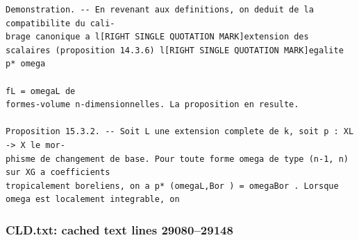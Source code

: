 \documentclass[
  11pt,
]{article}
\begin{document}
\begin{lstlisting}
Demonstration. -- En revenant aux definitions, on deduit de la compatibilite du cali-
brage canonique a l[RIGHT SINGLE QUOTATION MARK]extension des scalaires (proposition 14.3.6) l[RIGHT SINGLE QUOTATION MARK]egalite p* omega
                                                                              fL = omegaL de
formes-volume n-dimensionnelles. La proposition en resulte.

Proposition 15.3.2. -- Soit L une extension complete de k, soit p : XL -> X le mor-
phisme de changement de base. Pour toute forme omega de type (n-1, n) sur XG a coefficients
tropicalement boreliens, on a p* (omegaL,Bor ) = omegaBor . Lorsque omega est localement integrable, on
\end{lstlisting}

\subsubsection{CLD.txt: cached text lines
29080--29148}\label{cld.txt-cached-text-lines-2908029148}
\end{document}
